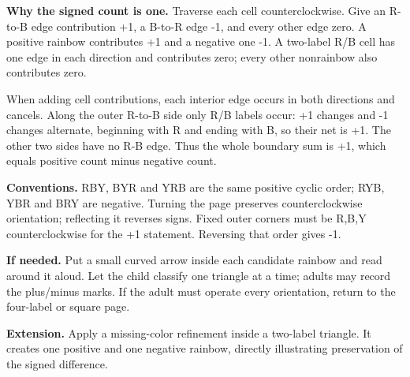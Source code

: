 \documentclass[11pt]{article}
\begin{document}
\textbf{Why the signed count is one.} Traverse each cell counterclockwise. Give an R-to-B edge contribution +1, a B-to-R edge -1, and every other edge zero. A positive rainbow contributes +1 and a negative one -1. A two-label R/B cell has one edge in each direction and contributes zero; every other nonrainbow also contributes zero.

When adding cell contributions, each interior edge occurs in both directions and cancels. Along the outer R-to-B side only R/B labels occur: +1 changes and -1 changes alternate, beginning with R and ending with B, so their net is +1. The other two sides have no R-B edge. Thus the whole boundary sum is +1, which equals positive count minus negative count.

\textbf{Conventions.} RBY, BYR and YRB are the same positive cyclic order; RYB, YBR and BRY are negative. Turning the page preserves counterclockwise orientation; reflecting it reverses signs. Fixed outer corners must be R,B,Y counterclockwise for the +1 statement. Reversing that order gives -1.

\textbf{If needed.} Put a small curved arrow inside each candidate rainbow and read around it aloud. Let the child classify one triangle at a time; adults may record the plus/minus marks. If the adult must operate every orientation, return to the four-label or square page.

\textbf{Extension.} Apply a missing-color refinement inside a two-label triangle. It creates one positive and one negative rainbow, directly illustrating preservation of the signed difference.
\end{document}
